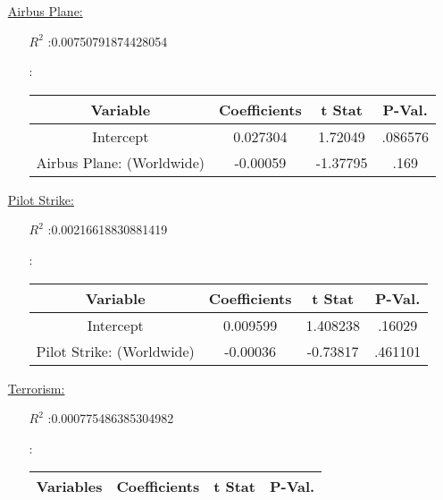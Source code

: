 \documentclass[12pt]{report}
\begin{document}
\begin{enumerate}
\begin{enumerate}
        \end{enumerate}
    \item[\underline{Airbus Plane:}]
        \begin{enumerate}
            \item[$R^2$]:0.00750791874428054
            \item[]:
                \begin{tabular}{|c|c|c|c|}
                    \toprule\hline
                    \textbf{Variable} & \textbf{Coefficients} & \textbf{t Stat}&\textbf{P-Val.} \\\hline

                    Intercept & 0.027304 & 1.72049 & .086576\\ \hline
                    Airbus Plane: (Worldwide) & -0.00059 & -1.37795 & .169\\ \hline
                    \bottomrule
                \end{tabular}




        \end{enumerate}
    \item[\underline{Pilot Strike:}]
        \begin{enumerate}
            \item[$R^2$]:0.00216618830881419
            \item[]:


                \begin{tabular}{|c|c|c|c|}
                    \toprule \hline
                    \textbf{Variable} & \textbf{Coefficients} & \textbf{t Stat} &\textbf{P-Val.}\\ \hline

                    Intercept & 0.009599 & 1.408238 &.16029\\ \hline
                    Pilot Strike: (Worldwide) & -0.00036 & -0.73817 &.461101\\ \hline
                    \bottomrule
                \end{tabular}



        \end{enumerate}
    \item[\underline{Terrorism:}]
        \begin{enumerate}
            \item[$R^2$]:0.000775486385304982
            \item[]:


                \begin{tabular}{|c|c|c|c|}
                    \toprule \hline
                    \textbf{Variables} & \textbf{Coefficients} & \textbf{t Stat} &\textbf{P-Val.}\\ \hline


\end{tabular}
\end{enumerate}
\end{enumerate}
\end{document}
